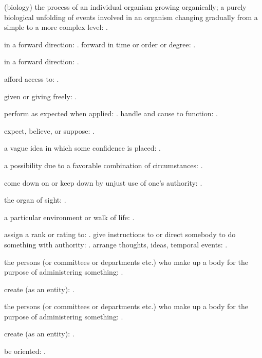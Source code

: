   (biology) the process of an individual organism growing organically; a purely biological unfolding of events involved in an organism changing gradually from a simple to a more complex level: .

  in a forward direction: . forward in time or order or degree: .

  in a forward direction: .

  afford access to: .

  given or giving freely: .

  perform as expected when applied: . handle and cause to function: .

  expect, believe, or suppose: .

  a vague idea in which some confidence is placed: .

  a possibility due to a favorable combination of circumstances: .

  come down on or keep down by unjust use of one's authority: .

  the organ of sight: .

  a particular environment or walk of life: .

  assign a rank or rating to: . give instructions to or direct somebody to do something with authority: . arrange thoughts, ideas, temporal events: .

  the persons (or committees or departments etc.) who make up a body for the purpose of administering something: .

  create (as an entity): .

  the persons (or committees or departments etc.) who make up a body for the purpose of administering something: .

  create (as an entity): .

  be oriented: .

